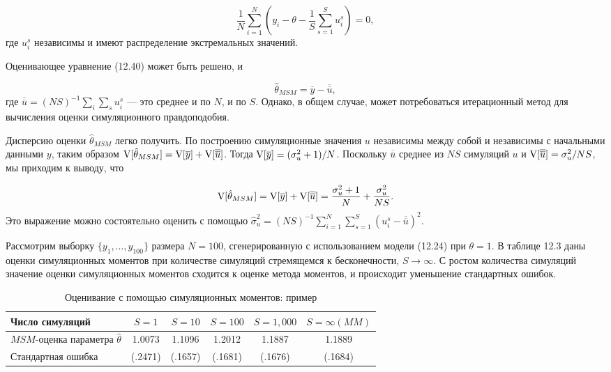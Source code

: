 \begin{equation}
\dfrac{1}{N}\sum^{N}_{i=1}\left(y_i-\theta-\dfrac{1}{S}\sum^{S}_{s=1}u^{s}_i \right)=0, 
\end{equation}
где $u^{s}_i$ независимы и имеют распределение экстремальных значений.

Оценивающее уравнение (12.40) может быть решено, и

\begin{equation}
\hat{\theta}_{MSM}=\overline{y}-\overline{\overline{u}},
\end{equation} 
где $\overline{\overline{u}}=(NS)^{-1}\sum_{i}\sum_{s}u^{s}_i$ --- это среднее и по $N$, и по $S$. Однако, в общем случае, может потребоваться итерационный метод для вычисления оценки симуляционного правдоподобия.

Дисперсию  оценки $\hat{\theta}_{MSM}$ легко получить. По построению симуляционные значения $u$ независимы между собой и независимы с начальными данными $y$, таким образом $\mathrm{V}[\hat{\theta}_{MSM}]=\mathrm{V}[\overline{y}]+\mathrm{V}[\overline{\overline{u}}]$. Тогда $\mathrm{V}[\overline{y}]=(\sigma^{2}_u+1)/N$. Поскольку $\overline{\overline{u}}$ среднее из $NS$ симуляций
$u$ и $\mathrm{V}[\overline{\overline{u}}]=\sigma^{2}_{u}/NS$, мы приходим к выводу, что

\begin{equation}
\mathrm{V}[\hat{\theta}_{MSM}]=\mathrm{V}[\overline{y}]+\mathrm{V}[\overline{\overline{u}}] = \dfrac{\sigma^{2}_u+1}{N}+\dfrac{\sigma^{2}_u}{NS}.
\end{equation}
Это выражение можно состоятельно оценить с помощью $\hat{\sigma}^{2}_u=(NS)^{-1}\sum^{N}_{i=1}\sum^{S}_{s=1}(u^{s}_i-\overline{\overline{u}})^2$.

Рассмотрим выборку $\lbrace{y_1,\ldots ,y_{100}}\rbrace$ размера $N=100$, сгенерированную с использованием модели (12.24) при $\theta=1$. В таблице 12.3 даны оценки симуляционных моментов при количестве симуляций стремящемся к бесконечности, $S \rightarrow \infty$. С ростом количества симуляций значение оценки симуляционных моментов сходится к оценке метода моментов, и происходит уменьшение стандартных ошибок.

\begin{table}[h]
\begin{center}
\caption{\label{tab:simulationest} Оценивание с помощью симуляционных моментов: пример}
\begin{tabular}{lccccc}
\hline 
\hline
{\bf{Число симуляций}} & $S = 1$ & $S = 10$ & $S = 100$ & $S = 1,000$ & $S = \infty (MM)$ \\ 
\hline
$MSM$-оценка параметра $\hat{\theta}$ & 1.0073 & 1.1096 & 1.2012 & 1.1887 & 1.1889 \\ 
Стандартная ошибка & (.2471) & (.1657) & (.1681) & (.1676) & (.1684) \\ 
\hline 
\hline
\end{tabular} 
\end{center}
\end{table}



